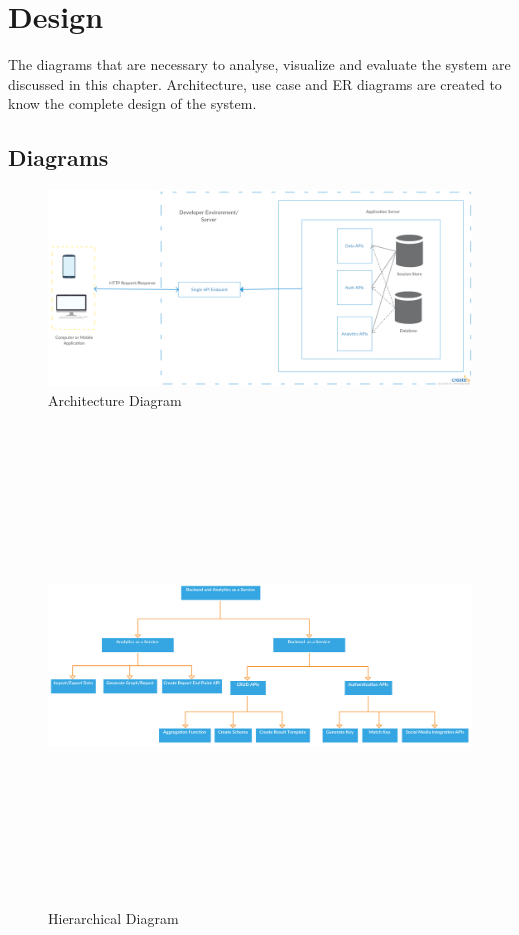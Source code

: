 \documentclass[a4paper,12pt]{report}
\begin{document}
    \chapter {Design}    
    The diagrams that are necessary to analyse, visualize and evaluate the system are discussed in this chapter. Architecture, use case and ER diagrams are created to know the complete design of the system.
    \section{Diagrams}          

                
        \begin{figure}[h]
          \includegraphics[width=1\textwidth,angle=0]{images/Architecture-Diagram.png}
        \caption{ Architecture Diagram}  
        \end{figure}

        \begin{figure}[h]
          \includegraphics[width=9.0in, height=5.0in ,angle=90]{images/Hierarchical-Diagram.png}
        \caption{ Hierarchical Diagram}  
        \end{figure}
\end{document}
